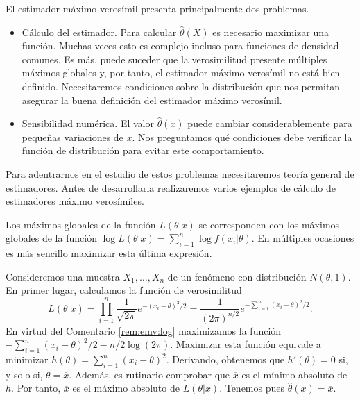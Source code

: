 \documentclass{article}
\begin{document}
    El estimador máximo verosímil presenta principalmente dos problemas.
    \begin{itemize}
        \item Cálculo del estimador. Para calcular $\hat{\theta}(X)$ es necesario maximizar una función. Muchas veces esto es complejo incluso para funciones de densidad comunes. Es más, puede suceder que la verosimilitud presente múltiples máximos globales y, por tanto, el estimador máximo verosímil no está bien definido. Necesitaremos condiciones sobre la distribución que nos permitan asegurar la buena definición del estimador máximo verosímil.
        \item Sensibilidad numérica. El valor $\hat{\theta}(x)$ puede cambiar considerablemente para pequeñas variaciones de $x$. Nos preguntamos qué condiciones debe verificar la función de distribución para evitar este comportamiento.
    \end{itemize}

    Para adentrarnos en el estudio de estos problemas necesitaremos teoría general de estimadores. Antes de desarrollarla realizaremos varios ejemplos de cálculo de estimadores máximo verosímiles.

    \begin{remark} \label{rem:emv:log}
        Los máximos globales de la función $L(\theta | x)$ se corresponden con los máximos globales de la función $\log L(\theta | x) = \sum_{i = 1}^n \log f(x_i | \theta)$. En múltiples ocasiones es más sencillo maximizar esta última expresión.
    \end{remark}

    \begin{ex}
        Consideremos una muestra $X_1, \ldots, X_n$ de un fenómeno con distribución $N(\theta,1)$. En primer lugar, calculamos la función de verosimilitud
        \[L(\theta | x) = \prod_{i = 1}^n \frac{1}{\sqrt{2\pi}} e^{-(x_i - \theta)^2 / 2} = \frac{1}{(2\pi)^{n/2}}e^{-\sum_{i = 1}^n (x_i - \theta)^2 / 2}.\]
        En virtud del Comentario \ref{rem:emv:log} maximizamos la función $-\sum_{i = 1}^n (x_i - \theta)^2 / 2 - n/2 \log(2\pi)$. Maximizar esta función equivale a minimizar $h(\theta) = \sum_{i = 1}^n (x_i - \theta)^2$. Derivando, obtenemos que $h'(\theta) = 0$ si, y solo si, $\theta = \overline{x}$. Además, es rutinario comprobar que $\overline{x}$ es el mínimo absoluto de $h$. Por tanto, $\overline{x}$ es el máximo absoluto de $L(\theta | x)$. Tenemos pues $\hat{\theta}(x) = \overline{x}$.
    \end{ex}
\end{document}
